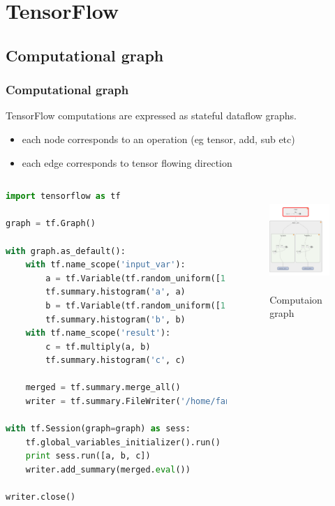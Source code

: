 
\section{TensorFlow}\label{sec:TF}

\subsection{Computational graph}

\begin{frame}[fragile]
  \MyLogo
  \frametitle{Computational graph}  
TensorFlow computations are expressed as stateful dataflow graphs.
\begin{itemize}
\item each node corresponds to an operation (eg tensor, add, sub etc)
\item each edge corresponds to tensor flowing direction
\end{itemize}
%  
\begin{columns}
\begin{lstlisting}[language=python]
import tensorflow as tf

graph = tf.Graph()

with graph.as_default():
	with tf.name_scope('input_var'):
		a = tf.Variable(tf.random_uniform([1, 10], -1.0, 1.0))
		tf.summary.histogram('a', a)
		b = tf.Variable(tf.random_uniform([1, 10], -1.0, 1.0))
		tf.summary.histogram('b', b)
	with tf.name_scope('result'):
		c = tf.multiply(a, b)
		tf.summary.histogram('c', c)
	
	merged = tf.summary.merge_all()
	writer = tf.summary.FileWriter('/home/fan/board', graph)

with tf.Session(graph=graph) as sess:
	tf.global_variables_initializer().run()
	print sess.run([a, b, c])
	writer.add_summary(merged.eval())

writer.close()

\end{lstlisting}
%
%
\begin{figure}[htbp] 
   \includegraphics[height=1.5in]{figures/compgraph.png} 
\caption{Computaion graph}
\end{figure}
\end{columns}
\end{frame}

